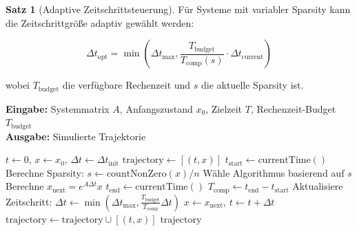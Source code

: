 \documentclass[a4paper,12pt]{report}
\theoremstyle{definition}
\newtheorem{satz}{Satz}
\begin{document}
	\begin{satz}[Adaptive Zeitschrittsteuerung]
		Für Systeme mit variabler Sparsity kann die Zeitschrittgröße adaptiv gewählt werden:
		
		\[
		\Delta t_{\text{opt}} = \min\left(\Delta t_{\text{max}}, \frac{T_{\text{budget}}}{T_{\text{comp}}(s)} \cdot \Delta t_{\text{current}}\right)
		\]
		
		wobei $T_{\text{budget}}$ die verfügbare Rechenzeit und $s$ die aktuelle Sparsity ist.
	\end{satz}
	
	\begin{algorithm}[H]
		\caption{Adaptive Echtzeit-Simulation}
		\label{alg:adaptive-realtime}
		\textbf{Eingabe:} Systemmatrix $A$, Anfangszustand $x_0$, Zielzeit $T$, Rechenzeit-Budget $T_{\text{budget}}$ \\
		\textbf{Ausgabe:} Simulierte Trajektorie
		\begin{algorithmic}[1]
			\State $t \gets 0$, $x \gets x_0$, $\Delta t \gets \Delta t_{\text{init}}$
			\State $\text{trajectory} \gets [(t, x)]$
			\State $t_{\text{start}} \gets \text{currentTime}()$
			\State Berechne Sparsity: $s \gets \text{countNonZero}(x) / n$
			\State Wähle Algorithmus basierend auf $s$
			\State Berechne $x_{\text{next}} = e^{A \Delta t} x$
			\State $t_{\text{end}} \gets \text{currentTime}()$
			\State $T_{\text{comp}} \gets t_{\text{end}} - t_{\text{start}}$
			\State Aktualisiere Zeitschritt: $\Delta t \gets \min(\Delta t_{\text{max}}, \frac{T_{\text{budget}}}{T_{\text{comp}}} \Delta t)$
			\State $x \gets x_{\text{next}}$, $t \gets t + \Delta t$
			\State $\text{trajectory} \gets \text{trajectory} \cup [(t, x)]$
			\EndWhile
			\State \Return $\text{trajectory}$
		\end{algorithmic}
	\end{algorithm}
\end{document}
